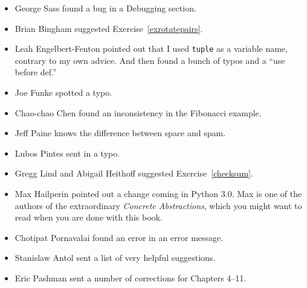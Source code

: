 \documentclass[10pt]{book}
\begin{document}
\begin{itemize}
\item George Sass found a bug in a Debugging section.


\item Brian Bingham suggested Exercise~\ref{exrotatepairs}.

\item Leah Engelbert-Fenton pointed out that I used {\tt tuple}
as a variable name, contrary to my own advice.  And then found
a bunch of typos and a ``use before def.''


\item Joe Funke spotted a typo.


\item Chao-chao Chen found an inconsistency in the Fibonacci example.


\item Jeff Paine knows the difference between space and spam.


\item Lubos Pintes sent in a typo.


\item Gregg Lind and Abigail Heithoff suggested Exercise~\ref{checksum}.


\item Max Hailperin pointed out a change coming in Python 3.0.  Max
is one of the authors of the extraordinary {\em Concrete Abstractions},
which you might want to read when you are done with this book.


\item Chotipat Pornavalai found an error in an error message.


\item Stanislaw Antol sent a list of very helpful suggestions.


\item Eric Pashman sent a number of corrections for Chapters 4--11.


\end{itemize}
\end{document}
